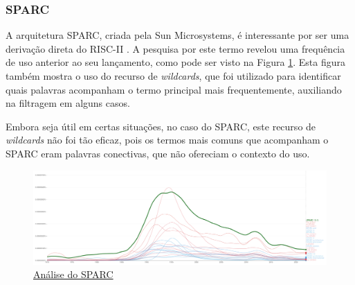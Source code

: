 \documentclass[
	article,			%
	11pt,				%
	oneside,			%
	a4paper,			%
	english,			%
	brazil,				%
	sumario=tradicional
	]{abntex2}
\begin{document}

\subsubsection{SPARC}

A arquitetura SPARC, criada pela Sun Microsystems, é interessante por ser uma derivação direta do RISC-II \cite[p. 116]{patterson_computer_1996}. A pesquisa por este termo revelou uma frequência de uso anterior ao seu lançamento, como pode ser visto na Figura \ref{fig:NgramSPARC}. Esta figura também mostra o uso do recurso de \textit{wildcards}, que foi utilizado para identificar quais palavras acompanham o termo principal mais frequentemente, auxiliando na filtragem em alguns casos.

Embora seja útil em certas situações, no caso do SPARC, este recurso de \textit{wildcards} não foi tão eficaz, pois os termos mais comuns que acompanham o SPARC eram palavras conectivas, que não ofereciam o contexto do uso.

\begin{figure}[h]
    \centering
    \includegraphics[width=1\linewidth]{Ngrams/SPARC_ALL.png}
    \caption{\href{https://books.google.com/ngrams/graph?content=SPARC *,* SPARC,(SPARC * 0.1)&year_start=1970&year_end=2022&corpus=en&smoothing=1}{Análise do SPARC}}
    \label{fig:NgramSPARC}
\end{figure}
\end{document}
